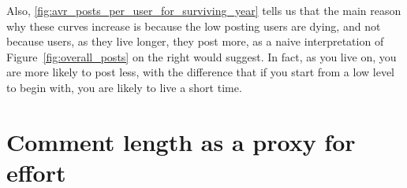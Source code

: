 Also, \ref{fig:avr_posts_per_user_for_surviving_year} tells us that the main reason why these curves increase is because the low posting users are dying, and not because users, as they live longer, they post more, as a naive interpretation of Figure~\ref{fig:overall_posts} on the right would suggest. In fact, as you live on, you are more likely to post less, with the difference that if you start from a low level to begin with, you are likely to live a short time.





\section{Comment length as a proxy for effort}

